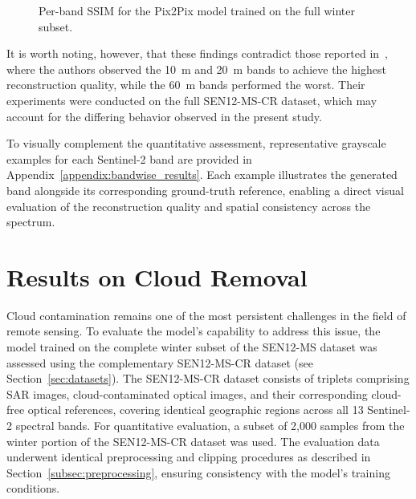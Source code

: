 \begin{figure}[h!]
\centering
{}
\caption[Per-band SSIM for the Pix2Pix model]{Per-band SSIM for the Pix2Pix model trained on the full winter subset.}
\label{fig:ssim_per_band}
\end{figure}

It is worth noting, however, that these findings contradict those reported in~\cite{CR_SEN2_dRNN}, where the authors observed the 10~m and 20~m bands to achieve the highest reconstruction quality, while the 60~m bands performed the worst. Their experiments were conducted on the full SEN12-MS-CR dataset, which may account for the differing behavior observed in the present study.

To visually complement the quantitative assessment, representative grayscale examples for each Sentinel-2 band are provided in Appendix~\ref{appendix:bandwise_results}. Each example illustrates the generated band alongside its corresponding ground-truth reference, enabling a direct visual evaluation of the reconstruction quality and spatial consistency across the spectrum.

\newpage

\section{Results on Cloud Removal}
\label{sec:cloud_removal}
Cloud contamination remains one of the most persistent challenges in the field of remote sensing. To evaluate the model’s capability to address this issue, the model trained on the complete winter subset of the SEN12-MS dataset was assessed using the complementary SEN12-MS-CR dataset (see Section~\ref{sec:datasets}). The SEN12-MS-CR dataset consists of triplets comprising SAR images, cloud-contaminated optical images, and their corresponding cloud-free optical references, covering identical geographic regions across all 13 Sentinel-2 spectral bands.
For quantitative evaluation, a subset of 2,000 samples from the winter portion of the SEN12-MS-CR dataset was used. The evaluation data underwent identical preprocessing and clipping procedures as described in Section~\ref{subsec:preprocessing}, ensuring consistency with the model’s training conditions.

